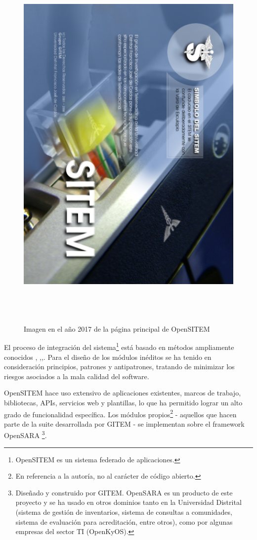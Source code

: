 \begin{figure}
 \centering
 \includegraphics[width=142mm, height=190mm]{sitem_principal.png}
 \caption{Imagen en el año 2017 de la página principal de OpenSITEM}
 \label{pantalla_sitem}
\end{figure}

El proceso de integración del sistema\footnote{OpenSITEM es un sistema federado de aplicaciones.} está basado en métodos ampliamente conocidos \cite {balduino2010}, \cite{koch},\cite{jacobson2000},\cite{larman2004}. Para el diseño de los módulos inéditos se ha tenido en consideración principios, patrones y antipatrones, tratando de minimizar los riesgos asociados a la mala calidad del software.

OpenSITEM hace uso extensivo de aplicaciones existentes, marcos de trabajo, bibliotecas, APIs, servicios web y plantillas, lo que ha permitido lograr un alto grado de funcionalidad específica. Los módulos propios\footnote{En referencia a la autoría, no al carácter de código abierto.} - aquellos que hacen parte de la suite desarrollada por GITEM - se implementan sobre el framework OpenSARA \footnote{Diseñado y construido por GITEM. OpenSARA es un producto de este proyecto y se ha usado en otros dominios tanto en la Universidad Distrital (sistema de gestión de inventarios, sistema de consultas a comunidades, sistema de evaluación para acreditación, entre otros), como por algunas empresas del sector TI (OpenKyOS).}.


